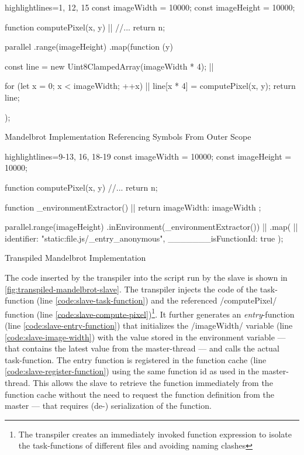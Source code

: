 \begin{listing}
	\begin{javascriptcode*}{highlightlines={1, 12, 15}}
const imageWidth = 10000;
const imageHeight = 10000;

function computePixel(x, y) { |$\label{code:mandelbrot-compute-pixel}$|
	//...  
	return n;
}
	
parallel
	.range(imageHeight)
	.map(function (y) {
		const line = new Uint8ClampedArray(imageWidth * 4); |$\label{code:mandelbrot-reference1-imageWidth}$|

		for (let x = 0; x < imageWidth; ++x) { |$\label{code:mandelbrot-reference2-imageWidth}$|
			line[x * 4] = computePixel(x, y);
		}
		return line;
});	
	\end{javascriptcode*}
	\caption{Mandelbrot Implementation Referencing Symbols From Outer Scope}
	\label{fig:mandelbrot-untranspiled}
\end{listing}

\begin{listing}
	\begin{javascriptcode*}{highlightlines={9-13, 16, 18-19}}
const imageWidth = 10000;
const imageHeight = 10000;

function computePixel(x, y) {
	//...
	return n;
}

function _environmentExtractor() { |$\label{code:mandelbrot-environment-extractor}$|
	return {
		imageWidth: imageWidth
	};
}

parallel.range(imageHeight)
	.inEnvironment(_environmentExtractor()) |$\label{code:mandelbrot-environment-call}$|
	.map({ |$\label{code:mandelbrot-function-id}$|
		identifier: "static:file.js/_entry_anonymous",
		_______isFunctionId: true
	});	
\end{javascriptcode*}
\caption{Transpiled Mandelbrot Implementation}
\label{fig:mandelbrot-transpiled}
\end{listing}



The code inserted by the transpiler into the script run by the slave is shown in \cref{fig:transpiled-mandelbrot-slave}. The transpiler injects the code of the task-function (line \ref{code:slave-task-function}) and the referenced \javascriptinline/computePixel/ function (line \ref{code:slave-compute-pixel})\footnote{The transpiler creates an immediately invoked function expression to isolate the task-functions of different files and avoiding naming clashes}. It further generates an \textit{entry}-function (line \ref{code:slave-entry-function}) that initializes the \javascriptinline/imageWidth/ variable (line \ref{code:slave-image-width}) with the value stored in the environment variable --- that contains the latest value from the master-thread --- and calls the actual task-function. The entry function is registered in the function cache (line \ref{code:slave-register-function}) using the same function id as used in the master-thread. This allows the slave to retrieve the function immediately from the function cache without the need to request the function definition from the master --- that requires (de-) serialization of the function.

